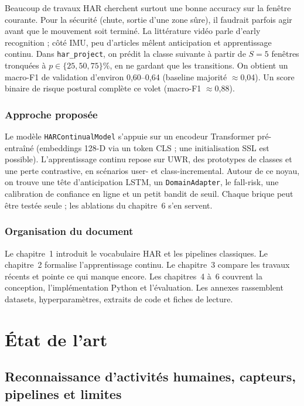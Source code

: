 \documentclass[a4paper,12pt]{report}
\begin{document}
Beaucoup de travaux HAR cherchent surtout une bonne accuracy sur la fenêtre
courante. Pour la sécurité (chute, sortie d'une zone sûre), il faudrait
parfois agir avant que le mouvement soit terminé. La littérature vidéo
\parencite{ryoo2011,gammulle2019} parle d'early recognition ; côté IMU, peu
d'articles mêlent anticipation et apprentissage continu. Dans
\texttt{har\_project}, on prédit la classe suivante à partir de $S=5$
fenêtres tronquées à $p\in\{25,50,75\}\%$, en ne gardant que les transitions.
On obtient un macro-F1 de validation d'environ 0,60--0,64 (baseline majorité
$\approx$0,04). Un score binaire de risque postural complète ce volet
(macro-F1 $\approx$0,88).

\section{Approche proposée}

Le modèle \texttt{HARContinualModel} s'appuie sur un encodeur Transformer
pré-entraîné (embeddings 128-D via un token CLS ; une initialisation SSL est
possible). L'apprentissage continu repose sur UWR, des prototypes de classes
et une perte contrastive, en scénarios user- et class-incremental. Autour de
ce noyau, on trouve une tête d'anticipation LSTM, un \texttt{DomainAdapter},
le fall-risk, une calibration de confiance en ligne et un petit bandit de
seuil. Chaque brique peut être testée seule ; les ablations du chapitre~6
s'en servent.

\section{Organisation du document}

Le chapitre~1 introduit le vocabulaire HAR et les pipelines classiques. Le
chapitre~2 formalise l'apprentissage continu. Le chapitre~3 compare les
travaux récents et pointe ce qui manque encore. Les chapitres~4 à~6
couvrent la conception, l'implémentation Python et l'évaluation. Les annexes
rassemblent datasets, hyperparamètres, extraits de code et fiches de lecture.




\clearpage
\part{État de l'art}

\chapter{Reconnaissance d'activités humaines, capteurs, pipelines et limites}
\label{ch:06-Chapter1}
\end{document}
